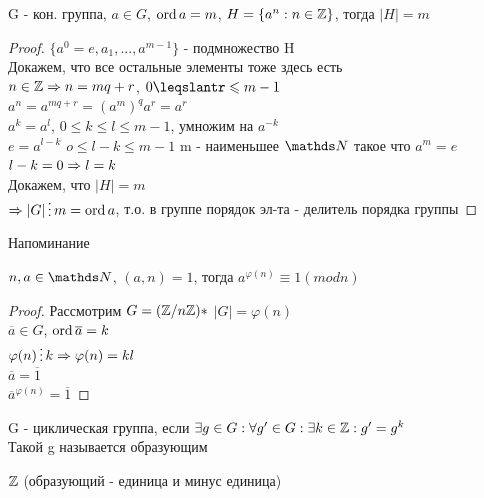 \documentclass[12pt, fleqn]{article}
\begin{document}
\begin{consequence}
    G - кон. группа, $a \in G$, $\mathop{\rm ord}\nolimits a = m$, $H=\{a^n:n \in \mathbb{Z}\}$, тогда $|H|=m$\\
\end{consequence}

\begin{proof}
    $\{a^0=e,a_1,...,a^{m-1}\}$ - подмножество H\\
    Докажем, что все остальные элементы тоже здесь есть\\
    $n \in \mathbb{Z} \Rightarrow n=m q+r$, $0 \leqslantr \leqslant m-1$\\
    $a^n=a^{m q+r}=(a^m)^q a^r=a^r$\\
    $a^k=a^l$, $0 \leqslant k \leqslant l \leqslant m-1$, умножим на $a^{-k}$\\
    $e=a^{l-k}$ $o \leqslant l-k \leqslant m-1$ m - наименьшее $\N$ такое что $a^m=e$\\
    $l-k=0 \Rightarrow l=k$\\
    Докажем, что $|H|=m$\\
    $\Ra |G| \devides m=\ord a$, т.о. в группе порядок эл-та - делитель порядка группы
\end{proof}

Напоминание 

\begin{consequence}
    $n,a \in \N$, $(a,n)=1$, тогда $a^{\varphi(n)} \equiv 1 (mod n)$
\end{consequence}

\begin{proof}
    Рассмотрим $G=(\mathbb{Z} / n \mathbb{Z})*$ $|G|=\varphi(n)$\\
    $\overline{a} \in G$, $\mathop{\rm ord}\nolimits \overline{a}=k$\\
    $\varphi(n) \devides k \Ra \varphi(n) = kl$\\
    $\overline{a}=\overline{1}$\\
    $\overline{a}^{\varphi(n)}=\overline{1}$
\end{proof}

\begin{definition}
    G - циклическая группа, если $\exists g \in G: \forall g' \in G: \exists k \in \mathbb{Z}: g'=g^k$\\
    Такой g называется образующим
\end{definition}

\begin{example}
    $\mathbb{Z}$ (образующий - единица и минус единица)
\end{example}
\end{document}

